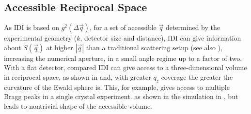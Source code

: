 \subsection{Accessible Reciprocal Space}

As IDI is based on $g^2(\Delta \vec{q})$, for a set of accessible $\vec{q}$ determined by the experimental geometry ($k$, detector size and distance), IDI can give information about $S(\vec{q})$ at higher $\left|\vec{q}\right|$ than a traditional scattering setup (see also ), increasing the numerical aperture, in a small angle regime up to a factor of two. With a flat detector, compared  IDI can give access to a three-dimensional volume in reciprocal space, as shown in  and, with greater $q_z$ coverage the greater the curvature of the Ewald sphere is. This, for example, gives access to multiple Bragg peaks in a single crystal experiment. 
as shown in the simulation in , but leads to nontrivial shape of the accessible volume. 

